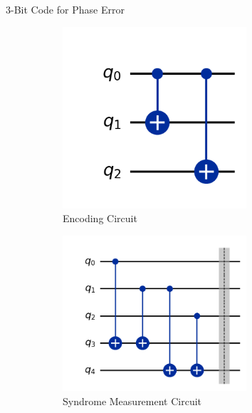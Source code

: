\documentclass[10pt]{beamer}
\begin{document}
\begin{frame}{3-Bit Code for Phase Error}
\begin{figure}[h!]
    \begin{subfigure}[b]{0.3\columnwidth}
        \centering
        \includegraphics[width=0.75\textwidth]{../../Codes/results/3bitPhaseEC/EncodingCircuit.png}
        \caption{Encoding Circuit}
        \label{fig:3bitPhaseECCircuit}
    \end{subfigure}
    \hfill
    \begin{subfigure}[b]{0.3\columnwidth}
        \centering
        \includegraphics[width=0.75\textwidth]{../../Codes/results/3bitPhaseEC/SyndromeMeasurementCircuit.png}
        \caption{Syndrome Measurement Circuit}
        \label{fig:3bitPhaseDecodingCircuit}
    \end{subfigure}
    \hfill
    \begin{subfigure}[b]{0.3\columnwidth}
        \centering

\end{subfigure}
\end{figure}
\end{frame}
\end{document}
